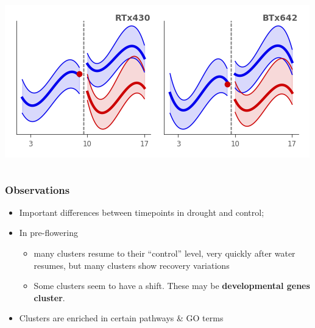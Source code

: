 \documentclass[xcolor=dvipsnames]{beamer}
\begin{document}
\begin{frame}
\begin{columns}
\begin{column}{0.3\linewidth}
\includegraphics[width=0.9\linewidth]{figures/clusters/root_Postflowering_8.png}

\end{column}
\end{columns}
\end{frame}

\begin{frame}
\frametitle{Observations}
\begin{itemize}[label=$\bullet$]
\item Important differences between timepoints in drought and control;
\item In pre-flowering
\begin{itemize}[label=$\bullet$]
\item  many clusters resume to their ``control'' level, very
quickly after water resumes, but many clusters show recovery variations
\item Some clusters seem to have a shift. These may be {\bf developmental genes
cluster}.
\end{itemize}
\item Clusters are enriched in certain pathways \& GO terms
\end{itemize}
\end{frame}
\end{document}
